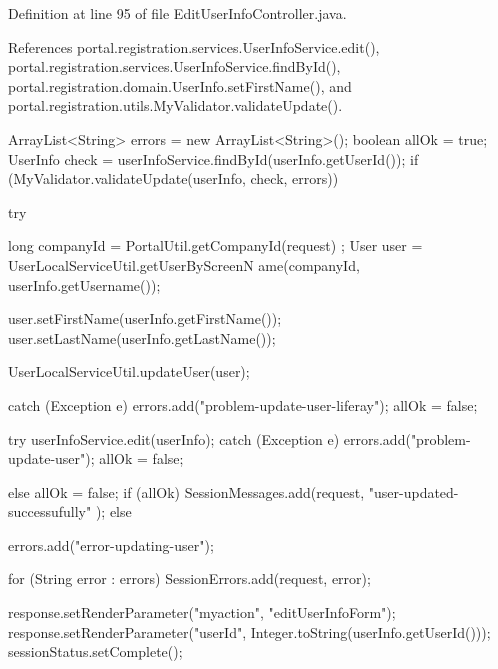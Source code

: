 Definition at line 95 of file EditUserInfoController.java.



References portal.registration.services.UserInfoService.edit(), portal.registration.services.UserInfoService.findById(), portal.registration.domain.UserInfo.setFirstName(), and portal.registration.utils.MyValidator.validateUpdate().


\begin{DoxyCode}
                                                                            {

                ArrayList<String> errors = new ArrayList<String>();
                boolean allOk = true;
                UserInfo check = userInfoService.findById(userInfo.getUserId());
                if (MyValidator.validateUpdate(userInfo, check, errors)) {

                        try {
                                long companyId = PortalUtil.getCompanyId(request)
      ;
                                User user = UserLocalServiceUtil.getUserByScreenN
      ame(companyId,
                                                userInfo.getUsername());

                                user.setFirstName(userInfo.getFirstName());
                                user.setLastName(userInfo.getLastName());

                                UserLocalServiceUtil.updateUser(user);

                        } catch (Exception e) {
                                errors.add("problem-update-user-liferay");
                                allOk = false;
                        }

                        try {
                                userInfoService.edit(userInfo);
                        } catch (Exception e) {
                                errors.add("problem-update-user");
                                allOk = false;
                        }
                } else {
                        allOk = false;
                }
                if (allOk) {
                        SessionMessages.add(request, "user-updated-successufully"
      );
                } else {
                        errors.add("error-updating-user");

                        for (String error : errors) {
                                SessionErrors.add(request, error);
                        }
                }

                response.setRenderParameter("myaction", "editUserInfoForm");
                response.setRenderParameter("userId",
                                Integer.toString(userInfo.getUserId()));
                sessionStatus.setComplete();

        }
\end{DoxyCode}


